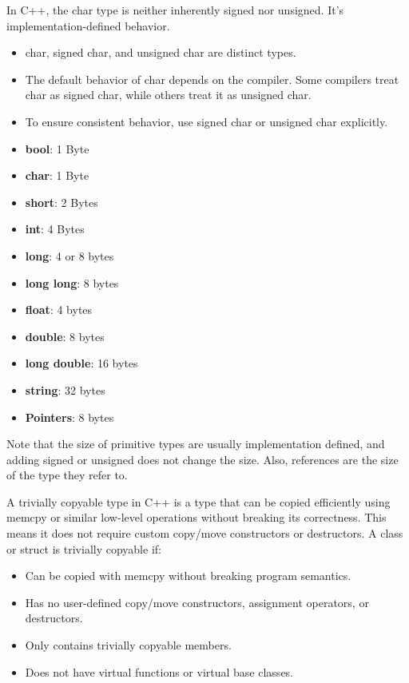 \documentclass{report}
\begin{document}
    \pagebreak 
    \bigbreak \noindent 
    In C++, the char type is neither inherently signed nor unsigned. It's implementation-defined behavior.
    \begin{itemize}
        \item char, signed char, and unsigned char are distinct types.
        \item The default behavior of char depends on the compiler. Some compilers treat char as signed char, while others treat it as unsigned char.
        \item To ensure consistent behavior, use signed char or unsigned char explicitly.
    \end{itemize}

    \pagebreak 
    \bigbreak \noindent 
    \begin{itemize}
        \item \textbf{bool}: 1 Byte
        \item \textbf{char}: 1 Byte
        \item \textbf{short}: 2 Bytes
        \item \textbf{int}: 4 Bytes
        \item \textbf{long}: 4 or 8 bytes
        \item \textbf{long long}: 8 bytes
        \item \textbf{float}: 4 bytes
        \item \textbf{double}: 8 bytes
        \item \textbf{long double}: 16 bytes
        \item \textbf{string}: 32 bytes
        \item \textbf{Pointers}: 8 bytes
    \end{itemize}
    \bigbreak \noindent 
    Note that the size of primitive types are usually implementation defined, and adding signed or unsigned does not change the size.
    \bigbreak \noindent 
    Also, references are the size of the type they refer to. 

    \pagebreak 
    \bigbreak \noindent 
    A trivially copyable type in C++ is a type that can be copied efficiently using memcpy or similar low-level operations without breaking its correctness. This means it does not require custom copy/move constructors or destructors.
    \bigbreak \noindent 
    A class or struct is trivially copyable if:
    \begin{itemize}
        \item Can be copied with memcpy without breaking program semantics.
        \item Has no user-defined copy/move constructors, assignment operators, or destructors.
        \item Only contains trivially copyable members.
        \item Does not have virtual functions or virtual base classes.
    \end{itemize}
\end{document}

